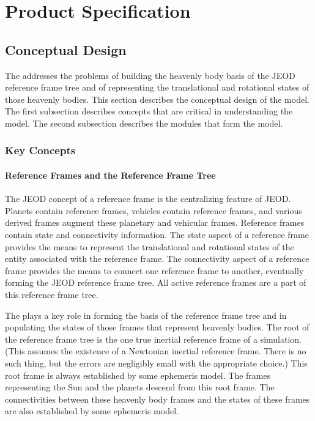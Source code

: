 \chapter{Product Specification}\label{ch:spec}

\section{Conceptual Design}

The \ModelDesc addresses the
problems of building the heavenly body basis of the JEOD reference frame tree
and of representing the translational and rotational states of those heavenly
bodies. This section describes the conceptual design of the model.
The first subsection describes concepts that are critical in understanding
the model. The second subsection describes the modules that form the model.


\subsection{Key Concepts}
\subsubsection{Reference Frames and the Reference Frame Tree}
The JEOD concept of a reference frame is the centralizing feature of JEOD.
Planets contain reference frames, vehicles contain reference frames,
and various derived frames augment these planetary and vehicular frames.
Reference frames contain state and connectivity information.
The state aspect of a reference frame provides the means to represent the
translational and rotational states of the entity associated with the
reference frame.
The connectivity aspect of a reference frame provides the means to connect one
reference frame to another, eventually forming the JEOD reference frame tree.
All active reference frames are a part of this reference frame tree.

The \ModelDesc plays a key role in forming the basis of the reference frame tree
and in populating the states of those frames that represent heavenly bodies.
The root of the reference frame tree is the one true inertial
reference frame of a simulation. (This assumes the existence of a Newtonian
inertial reference frame. There is no such thing, but the errors are negligibly
small with the appropriate choice.) This root frame is always established by
some ephemeris model. The frames representing the Sun and the planets descend
from this root frame. The connectivities between these heavenly body frames
and the states of these frames are also established by some ephemeris model.

